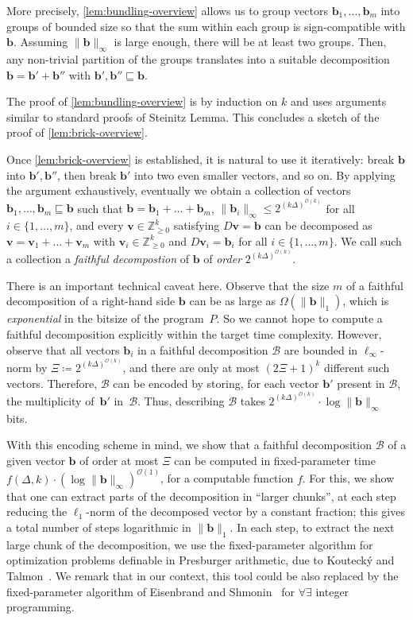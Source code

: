 \documentclass{theoretics}
\renewcommand{\leq}{\leqslant}
\renewcommand{\geq}{\geqslant}
\newcommand{\cfleq}{\sqsubseteq}
\newcommand{\Bb}{\mathcal{B}}
\newcommand{\Z}{\mathbb{Z}}
\newcommand{\Zn}{\Z_{\geq 0}}
\newcommand{\tup}[1]{{\mathbf{#1}}}
\newcommand{\bb}{\tup b}
\newcommand{\myvv}{\tup v} %
\newcommand{\Oh}{{\mathcal{O}}}
\begin{document}
More precisely, \cref{lem:bundling-overview} allows us to group vectors $\bb_1,\ldots,\bb_m$ into groups of bounded size so that the sum within each group is sign-compatible with $\bb$. Assuming $\|\bb\|_\infty$ is large enough, there will be at least two groups. Then, any non-trivial partition of the groups translates into a suitable decomposition $\bb=\bb'+\bb''$ with $\bb',\bb''\cfleq \bb$.

The proof of \cref{lem:bundling-overview} is by induction on $k$ and uses arguments similar to standard proofs of Steinitz Lemma. This concludes a sketch of the proof of \cref{lem:brick-overview}.
\medskip

Once \cref{lem:brick-overview} is established, it is natural to use it iteratively: break $\bb$ into $\bb',\bb''$, then break $\bb'$ into two even smaller vectors, and so on. By applying the argument exhaustively, eventually we obtain a collection of vectors $\bb_1,\ldots,\bb_m\cfleq \bb$ such that $\bb=\bb_1+\ldots+\bb_m$,  $\|\bb_i\|_\infty\leq 2^{(k\Delta)^{\Oh(k)}}$ for all $i\in \{1,\ldots,m\}$, and every $\myvv\in \Zn^k$ satisfying $D\myvv=\bb$ can be decomposed as $\myvv=\myvv_1+\ldots+\myvv_m$ with $\myvv_i\in \Zn^k$ and $D\myvv_i=\bb_i$ for all $i\in \{1,\ldots,m\}$. We call such a collection a {\em{faithful decompostion}} of $\bb$ of {\em{order}} $2^{(k\Delta)^{\Oh(k)}}$.

There is an important technical caveat here. Observe that the size $m$ of a faithful decomposition of a right-hand side $\bb$ can be as large as $\Omega(\|\bb\|_1)$, which is {\em{exponential}} in the bitsize of the program~$P$. So we cannot hope to compute a faithful decomposition explicitly within the target time complexity. However, observe that all vectors $\bb_i$ in a faithful decomposition $\Bb$ are bounded in $\ell_\infty$-norm by $\Xi\coloneqq 2^{(k\Delta)^{\Oh(k)}}$, and there are only at most $(2\Xi+1)^k$ different such vectors. Therefore, $\Bb$ can be encoded by storing, for each vector $\bb'$ present in $\Bb$, the multiplicity of~$\bb'$ in~$\Bb$. Thus, describing $\Bb$ takes $2^{(k\Delta)^{\Oh(k)}}\cdot \log \|\bb\|_\infty$ bits.

With this encoding scheme in mind, we show that a faithful decomposition $\Bb$ of a given vector $\bb$ of order at most $\Xi$ can be computed in fixed-parameter time $f(\Delta,k)\cdot (\log \|\bb\|_\infty)^{\Oh(1)}$, for a computable function $f$. For this, we show that one can extract parts of the decomposition in ``larger chunks'', at each step reducing the $\ell_1$-norm of the decomposed vector by a constant fraction; this gives a total number of steps logarithmic in $\|\bb\|_1$. In each step, to extract the next large chunk of the decomposition, we use the fixed-parameter algorithm for optimization problems definable in Presburger arithmetic, due to Kouteck\'y and Talmon~\cite{KouteckyT21}. We remark that in our context, this tool could be also replaced by the fixed-parameter algorithm of Eisenbrand and Shmonin~\cite{DBLP:journals/mor/EisenbrandS08} for $\forall\exists$ integer programming.
\end{document}
